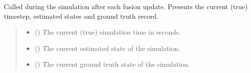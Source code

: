 \documentclass[letterpaper,10pt,english]{sphinxmanual}
\begin{document}
\begin{fulllineitems}
\begin{fulllineitems}
\label{\detokenize{modules/simulation/display:qnav.simulation.display.Display.on_update}}
\pysigstartsignatures
{}
\pysigstopsignatures
\sphinxAtStartPar
Called during the simulation after each fusion update.
Presents the current (true) timestep, estimated states and ground
truth record.
\begin{quote}\begin{description}
\begin{itemize}
\item {} 
\sphinxAtStartPar
{} () \textendash{} The current (true) simulation time in seconds.

\item {} 
\sphinxAtStartPar
{} ({\hyperref[\detokenize{modules/estimation/state:qnav.estimation.state.EstimatedState}]{}}) \textendash{} The current estimated state of the simulation.

\item {} 
\sphinxAtStartPar
{} ({\hyperref[\detokenize{modules/waypoints/trajectory:qnav.waypoints.trajectory.GroundTruth}]{}}) \textendash{} The current ground truth state of the simulation.

\end{itemize}

\end{description}\end{quote}

\end{fulllineitems}


\end{fulllineitems}
\end{document}
